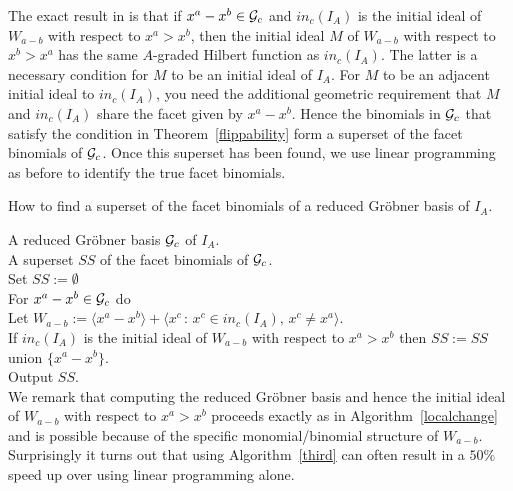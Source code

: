 \documentclass[11pt]{article}
\begin{document}
The exact result in \cite{MT} is that if $x^a-x^b \in {\cal G}_c$ 
and $in_c(I_A)$ is the initial ideal of $W_{a-b}$ with respect to 
$x^a > x^b$, then the initial
ideal $M$ of $W_{a-b}$ with respect to $x^b > x^a$ has the same
$A$-graded Hilbert function as $in_c(I_A)$. The latter is a necessary
condition for $M$ to be an initial ideal of $I_A$. For $M$ to be an
adjacent  initial ideal to $in_c(I_A)$, you need the additional
geometric requirement that $M$ and $in_c(I_A)$ share the facet given
by $x^a-x^b$. Hence the binomials in ${\cal G}_c$ that satisfy the  
condition in Theorem~\ref{flippability} form a superset of the facet 
binomials of ${\cal G}_c$. Once this superset has been found, 
we use linear programming as before to identify the true facet binomials.

\begin{algorithm}\label{third}
How to find a superset of the facet binomials of a reduced Gr\"obner
basis of $I_A$.
\end{algorithm}
 A reduced Gr\"obner basis ${\cal G}_c$ of
$I_A$.\\
 A superset $SS$ of the facet binomials of
${\cal G}_c$.\\
\noindent Set $SS := \emptyset$\\
\indent For $x^a - x^b \in {\cal G}_c$ do \\
\indent \indent Let $W_{a-b} := \langle x^a - x^b \rangle + \langle
x^c \, : \, x^c \in in_c(I_A), \, x^c \neq x^a \rangle$.\\
\indent \indent If $in_c(I_A)$ is the initial ideal of $W_{a-b}$ with
respect to $x^a > x^b$ then $SS := SS$ union $\{x^a-x^b\}$.\\
Output $SS$.\\

We remark that computing the reduced Gr\"obner basis and hence the
initial ideal of $W_{a-b}$ with respect to $x^a > x^b$ proceeds
exactly as in Algorithm~\ref{localchange} and is possible because of
the specific monomial/binomial structure of $W_{a-b}$. Surprisingly 
it turns out that using Algorithm~\ref{third} can often result in 
a $50\%$ speed up over using linear programming alone.  
\end{document}
